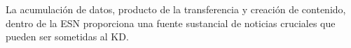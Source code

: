\documentclass[a4paper,fleqn,spanish]{cas-dc}
\begin{document}
La acumulación de datos, producto de la transferencia y creación de contenido,
dentro de la ESN proporciona una fuente sustancial de noticias cruciales que
pueden ser sometidas al KD. 







\end{document}
